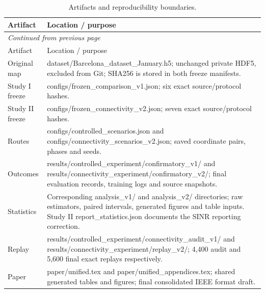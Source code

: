 {\footnotesize\setlength{\tabcolsep}{3pt}
\begin{longtable}{@{}p{}p{}@{}}
\caption{Artifacts and reproducibility boundaries.}\label{tab:artifacts}\\
\toprule Artifact & Location / purpose\\\midrule
\endfirsthead
\multicolumn{2}{l}{\textit{Continued from previous page}}\\\toprule
Artifact & Location / purpose\\\midrule
\endhead
\bottomrule\endfoot
Original map & dataset/Barcelona\_dataset\_January.h5; unchanged private HDF5, excluded from Git; SHA256 is stored in both freeze manifests.\\
Study I freeze & configs/frozen\_comparison\_v1.json; six exact source/protocol hashes.\\
Study II freeze & configs/frozen\_connectivity\_v2.json; seven exact source/protocol hashes.\\
Routes & configs/controlled\_scenarios.json and configs/connectivity\_scenarios\_v2.json; saved coordinate pairs, phases and seeds.\\
Outcomes & results/controlled\_experiment/confirmatory\_v1/ and results/connectivity\_experiment/confirmatory\_v2/; final evaluation records, training logs and source snapshots.\\
Statistics & Corresponding analysis\_v1/ and analysis\_v2/ directories; raw estimators, paired intervals, generated figures and table inputs. Study II report\_statistics.json documents the SINR reporting correction.\\
Replay & results/controlled\_experiment/connectivity\_audit\_v1/ and results/connectivity\_experiment/replay\_v2/; 4,400 audit and 5,600 final exact replays respectively.\\
Paper & paper/unified.tex and paper/unified\_appendices.tex; shared generated tables and figures; final consolidated IEEE format draft.\\
\end{longtable}}
